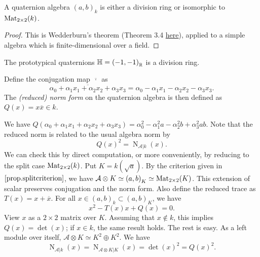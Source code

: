 \documentclass{article}
\newcommand{\qa}[2]{\left(#1\right)_{#2}}
\begin{document}
\begin{lemma}\label{lem.quatalgwedd}
    A quaternion algebra $\qa{a,b}{k}$ is either a division ring or isomorphic to $\operatorname{Mat}_{2\times 2}(k)$.
\end{lemma}

\begin{proof}
    This is Wedderburn's theorem (Theorem 3.4 \href{https://caelestia.github.io/2025/0603.pdf}{here}), applied to a simple algebra which is finite-dimensional over a field.
\end{proof}

\begin{example}
    The prototypical quaternions $\HH=\qa{-1,-1}{\R}$ is a division ring.
\end{example}

\begin{definition}
    Define the conjugation map $\overline{\,\cdot\,}$ as
    \begin{equation*}
        \overline{\alpha_0+\alpha_1x_1+\alpha_2x_2+\alpha_3x_3}=\alpha_0-\alpha_1x_1-\alpha_2x_2-\alpha_3x_3.
    \end{equation*}
    The \emph{(reduced) norm form} on the quaternion algebra is then defined as $Q(x)=x\overline{x}\in k$.
\end{definition}

We have $Q(\alpha_0+\alpha_1x_1+\alpha_2x_2+\alpha_3x_3)=\alpha_0^2-\alpha_1^2a-\alpha_2^2b+\alpha_3^2ab$. Note that the reduced norm is related to the usual algebra norm by
\begin{equation}
    Q(x)^2=\operatorname{N}_{\mathcal{A}\vert k}(x).
\end{equation}
We can check this by direct computation, or more conveniently, by reducing to the split case $\operatorname{Mat}_{2\times 2}(k)$. Put $K=k(\sqrt{a})$. By the criterion given in $\ref{prop.splitcriterion}$, we have $\mathcal{A}\otimes K\simeq \qa{a,b}{K}\simeq \Mat{2\times 2}(K)$. This extension of scalar preserves conjugation and the norm form. Also define the reduced trace as $T(x)=x+\overline{x}$. For all $x\in\qa{a,b}{k}\subset\qa{a,b}{K}$, we have
\begin{equation*}
    x^2-T(x)x+Q(x)=0.
\end{equation*}
View $x$ as a $2\times 2$ matrix over $K$. Assuming that $x\notin k$, this implies $Q(x)=\det(x)$; if $x\in k$,  the same result holds. The rest is easy. As a left module over itself, $\mathcal{A}\otimes K\simeq K^2\oplus K^2$. We have
\begin{equation*}
    \operatorname{N}_{\mathcal{A}\vert k}(x)=\operatorname{N}_{\mathcal{A}\otimes K\vert K}(x)=\det(x)^2=Q(x)^2.
\end{equation*} 
\end{document}
